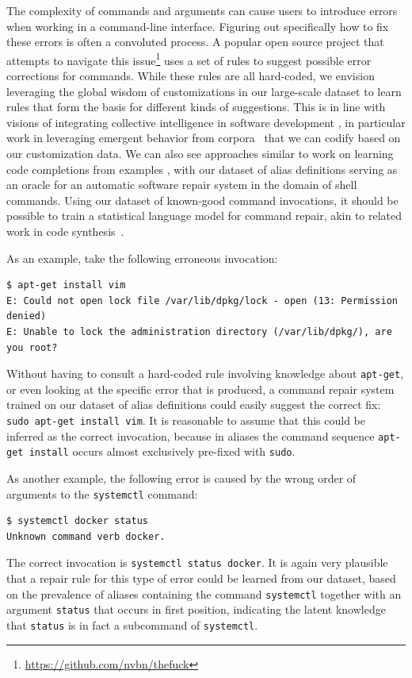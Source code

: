 \documentclass[sigconf,nonacm,screen]{acmart}
\newcommand{\num}[1]{\numprint{#1}}
\newcommand{\cmd}[1]{{\texttt{#1}}}
\begin{document}
The complexity of commands and arguments can cause users to introduce errors when working in a command-line interface.
Figuring out specifically how to fix these errors is often a convoluted process.
A popular open source project that attempts to navigate this issue\footnote{\url{https://github.com/nvbn/thefuck}} uses a set of rules to suggest possible error corrections for commands.
While these rules are all hard-coded, we envision leveraging the global wisdom of customizations in our large-scale dataset to learn rules that form the basis for different kinds of suggestions.
This is in line with visions of integrating collective intelligence in software development \citep{bruch:10}, in particular work in leveraging emergent behavior from corpora~\citep{fast:14} that we can codify based on our customization data.
We can also see approaches similar to work on learning code completions from examples \citep{bruch:09}, with our dataset of alias definitions serving as an oracle for an automatic software repair system \citep{monperrus:18} in the domain of shell commands.
Using our dataset of known-good command invocations, it should be possible to train a statistical language model for command repair, akin to related work in code synthesis~\citep{raychev2014completion}.

As an example, take the following erroneous invocation:
\begin{Verbatim}[breaklines=true]
$ apt-get install vim
E: Could not open lock file /var/lib/dpkg/lock - open (13: Permission denied)
E: Unable to lock the administration directory (/var/lib/dpkg/), are you root?
\end{Verbatim}
Without having to consult a hard-coded rule involving knowledge about \cmd{apt-get}, or even looking at the specific error that is produced, a command repair system trained on our dataset of alias definitions could easily suggest the correct fix: \texttt{sudo apt-get install vim}.
It is reasonable to assume that this could be inferred as the correct invocation, because in aliases the command sequence \texttt{apt-get install} occurs almost exclusively pre-fixed with \cmd{sudo}.

As another example, the following error is caused by the wrong order of arguments to the \cmd{systemctl} command:
\begin{Verbatim}
$ systemctl docker status
Unknown command verb docker.
\end{Verbatim}
The correct invocation is \texttt{systemctl status docker}.
It is again very plausible that a repair rule for this type of error could be learned from our dataset, based on the prevalence of aliases containing the command \cmd{systemctl} together with an argument \texttt{status} that occurs in first position,
indicating the latent knowledge that \texttt{status} is in fact a subcommand of \cmd{systemctl}.
\end{document}
